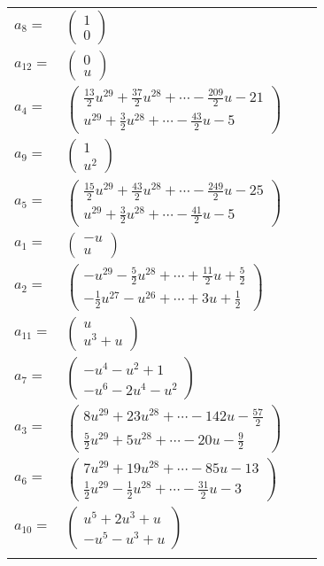 \documentclass[1p]{elsarticle_modified}
\theoremstyle{definition}
\begin{document}
\begin{tabular}{m{7pt} m{180pt} m{7pt} m{180pt} }
\flushright $a_{8}=$&$\begin{pmatrix}1\\0\end{pmatrix}$ \\
\flushright $a_{12}=$&$\begin{pmatrix}0\\u\end{pmatrix}$ \\
\flushright $a_{4}=$&$\begin{pmatrix}\frac{13}{2} u^{29}+\frac{37}{2} u^{28}+\cdots-\frac{209}{2} u-21\\u^{29}+\frac{3}{2} u^{28}+\cdots-\frac{43}{2} u-5\end{pmatrix}$ \\
\flushright $a_{9}=$&$\begin{pmatrix}1\\u^2\end{pmatrix}$ \\
\flushright $a_{5}=$&$\begin{pmatrix}\frac{15}{2} u^{29}+\frac{43}{2} u^{28}+\cdots-\frac{249}{2} u-25\\u^{29}+\frac{3}{2} u^{28}+\cdots-\frac{41}{2} u-5\end{pmatrix}$ \\
\flushright $a_{1}=$&$\begin{pmatrix}- u\\u\end{pmatrix}$ \\
\flushright $a_{2}=$&$\begin{pmatrix}- u^{29}-\frac{5}{2} u^{28}+\cdots+\frac{11}{2} u+\frac{5}{2}\\-\frac{1}{2} u^{27}- u^{26}+\cdots+3 u+\frac{1}{2}\end{pmatrix}$ \\
\flushright $a_{11}=$&$\begin{pmatrix}u\\u^3+u\end{pmatrix}$ \\
\flushright $a_{7}=$&$\begin{pmatrix}- u^4- u^2+1\\- u^6-2 u^4- u^2\end{pmatrix}$ \\
\flushright $a_{3}=$&$\begin{pmatrix}8 u^{29}+23 u^{28}+\cdots-142 u-\frac{57}{2}\\\frac{5}{2} u^{29}+5 u^{28}+\cdots-20 u-\frac{9}{2}\end{pmatrix}$ \\
\flushright $a_{6}=$&$\begin{pmatrix}7 u^{29}+19 u^{28}+\cdots-85 u-13\\\frac{1}{2} u^{29}-\frac{1}{2} u^{28}+\cdots-\frac{31}{2} u-3\end{pmatrix}$ \\
\flushright $a_{10}=$&$\begin{pmatrix}u^5+2 u^3+u\\- u^5- u^3+u\end{pmatrix}$\\&\end{tabular}
\end{document}
